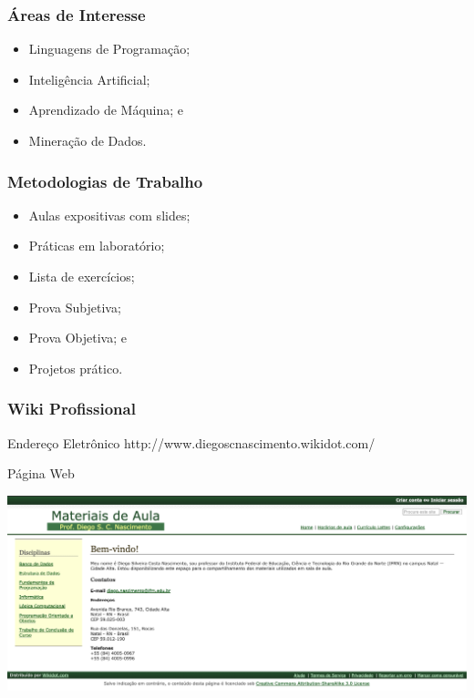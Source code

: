 \documentclass{beamer}
\begin{document}
\begin{frame}
	\frametitle{Áreas de Interesse}
	
	\begin{itemize}
        \item Linguagens de Programação;
		\item Inteligência Artificial;
		\item Aprendizado de Máquina; e
		\item Mineração de Dados.
	\end{itemize}
\end{frame}

\begin{frame}
	\frametitle{Metodologias de Trabalho}
	
	\begin{itemize}
		\item Aulas expositivas com slides;
		\item Práticas em laboratório;
		\item Lista de exercícios;
	    \item Prova Subjetiva;
	    \item Prova Objetiva; e 
		\item Projetos prático.
	\end{itemize}
\end{frame}

\begin{frame}
	\frametitle{Wiki Profissional}
	
	\begin{block}{Endereço Eletrônico}
	http://www.diegoscnascimento.wikidot.com/
	\end{block} \vfill
	
	\begin{exampleblock}{Página Web}
		\begin{center}
			\includegraphics[scale=0.2]{imagens/pagina}
		\end{center}
	\end{exampleblock}
\end{frame}
\end{document}
